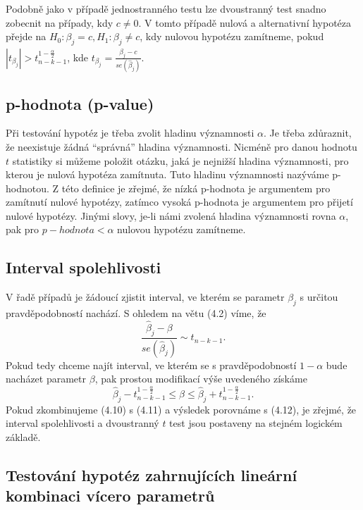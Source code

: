 Podobně jako v případě jednostranného testu lze dvoustranný test snadno zobecnit na případy, kdy $c \ne 0$. V tomto případě nulová a alternativní hypotéza přejde na $H_0: \beta_j = c, H_1: \beta_j \ne c$, kdy nulovou hypotézu zamítneme, pokud $|t_{\beta_j}| > t_{n-k-1}^{1 - \frac{\alpha}{2}}$, kde $t_{\beta_j} = \frac{\hat{\beta}_j - c}{se(\hat{\beta}_j)}$.

\subsection{p-hodnota (p-value)}

Při testování hypotéz je třeba zvolit hladinu významnosti $\alpha$. Je třeba zdůraznit, že neexistuje žádná ``správná'' hladina 
významnosti. Nicméně pro danou hodnotu $t$ statistiky si můžeme položit otázku, jaká je nejnižší hladina významnosti, pro kterou je 
nulová hypotéza zamítnuta. Tuto hladinu významnosti nazýváme p-hodnotou. Z této definice je zřejmé, že nízká p-hodnota je argumentem pro 
zamítnutí nulové hypotézy, zatímco vysoká p-hodnota je argumentem pro přijetí nulové hypotézy. Jinými slovy, je-li námi zvolená 
hladina významnosti rovna $\alpha$, pak pro $p-hodnota < \alpha$ nulovou hypotézu zamítneme.

\subsection{Interval spolehlivosti}

V řadě případů je žádoucí zjistit interval, ve kterém se parametr $\beta_j$ s určitou pravděpodobností nachází. S ohledem na větu (4.2) víme, že
\begin{equation}
\frac{\hat{\beta}_j - \beta}{se(\hat{\beta}_j)} \sim t_{n - k -1}.
\end{equation}
Pokud tedy chceme najít interval, ve kterém se s pravděpodobností $1 - \alpha$ bude nacházet parametr $\beta$, pak prostou modifikací výše 
uvedeného získáme
\begin{equation}
\hat{\beta}_j - t_{n - k -1}^{1 - \frac{\alpha}{2}} \le \beta \le \hat{\beta}_j + t_{n - k -1}^{1 - \frac{\alpha}{2}}.
\end{equation}
Pokud zkombinujeme (4.10) s (4.11) a výsledek porovnáme s (4.12), je zřejmé, že interval spolehlivosti a dvoustranný $t$ test jsou postaveny na 
stejném logickém základě.

\subsection{Testování hypotéz zahrnujících lineární kombinaci vícero parametrů}

